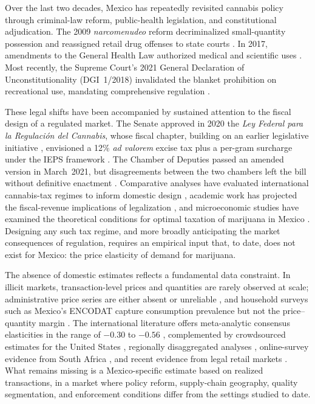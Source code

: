 
Over the last two decades, Mexico has repeatedly revisited cannabis policy through criminal-law reform, public-health legislation, and constitutional adjudication.  The 2009 \emph{narcomenudeo} reform decriminalized small-quantity possession and reassigned retail drug offenses to state courts \citep{dof2009narcomenudeo,lgs2009doseTable}.  In 2017, amendments to the General Health Law authorized medical and scientific uses \citep{dof2017medicalcannabis}.  Most recently, the Supreme Court's 2021 General Declaration of Unconstitutionality (DGI~1/2018) invalidated the blanket prohibition on recreational use, mandating comprehensive regulation \citep{scjn2021dgi}.

These legal shifts have been accompanied by sustained attention to the fiscal design of a regulated market.  The Senate approved in 2020 the \emph{Ley Federal para la Regulaci\'{o}n del Cannabis}, whose fiscal chapter, building on an earlier legislative initiative \citep{delgado2019iniciativa}, envisioned a 12\% \emph{ad valorem} excise tax plus a per-gram surcharge under the IEPS framework \citep{senado2021minuta}.  The Chamber of Deputies passed an amended version in March~2021, but disagreements between the two chambers left the bill without definitive enactment \citep{diputados2021dictamen}.  Comparative analyses have evaluated international cannabis-tax regimes to inform domestic design \citep{clavellina2020cannabis_taxes}, academic work has projected the fiscal-revenue implications of legalization \citep{hernandezmacías2021impacto}, and microeconomic studies have examined the theoretical conditions for optimal taxation of marijuana in Mexico \citep{perezromero2014elementos}.  Designing any such tax regime, and more broadly anticipating the market consequences of regulation, requires an empirical input that, to date, does not exist for Mexico: the price elasticity of demand for marijuana.

The absence of domestic estimates reflects a fundamental data constraint.  In illicit markets, transaction-level prices and quantities are rarely observed at scale; administrative price series are either absent or unreliable \citep{caulkins1998price}, and household surveys such as Mexico's ENCODAT capture consumption prevalence but not the price--quantity margin \citep{encodat2025}.  The international literature offers meta-analytic consensus elasticities in the range of $-0.30$ to $-0.56$ \citep{gallet2014monkey}, complemented by crowdsourced estimates for the United States \citep{davis2016crowd}, regionally disaggregated analyses \citep{halcoussis2017geo}, online-survey evidence from South Africa \citep{riley2020southafrica}, and recent evidence from legal retail markets \citep{han2025commercialization,dodd2025canada}.  What remains missing is a Mexico-specific estimate based on realized transactions, in a market where policy reform, supply-chain geography, quality segmentation, and enforcement conditions differ from the settings studied to date.

